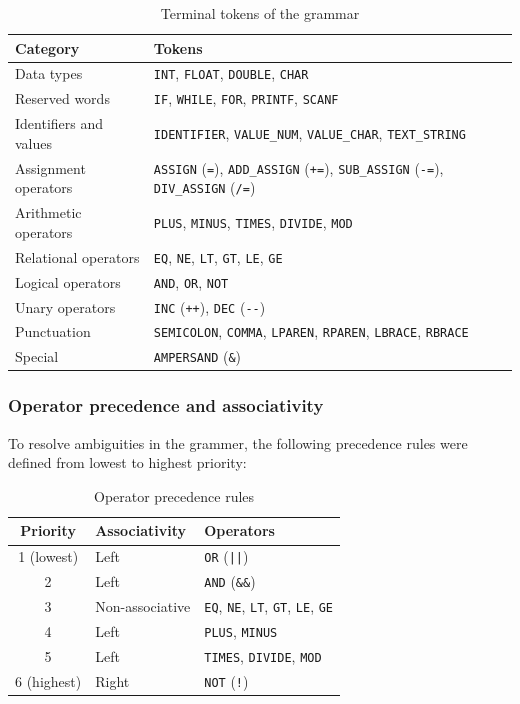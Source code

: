 \documentclass[letterpaper,12pt,oneside]{article}
\begin{document}
\begin{table}[H]
\centering
\caption{Terminal tokens of the grammar}
\begin{tabular}{|l|l|}
\hline
\rowcolor{gray!20}
\textbf{Category} & \textbf{Tokens} \\
\hline
Data types & \texttt{INT}, \texttt{FLOAT}, \texttt{DOUBLE}, \texttt{CHAR} \\
\hline
Reserved words & \texttt{IF}, \texttt{WHILE}, \texttt{FOR}, \texttt{PRINTF}, \texttt{SCANF} \\
\hline
Identifiers and values & \texttt{IDENTIFIER}, \texttt{VALUE\_NUM}, \texttt{VALUE\_CHAR}, \texttt{TEXT\_STRING} \\
\hline
Assignment operators & \texttt{ASSIGN} (\texttt{=}), \texttt{ADD\_ASSIGN} (\texttt{+=}), \texttt{SUB\_ASSIGN} (\texttt{-=}), \texttt{DIV\_ASSIGN} (\texttt{/=}) \\
\hline
Arithmetic operators & \texttt{PLUS}, \texttt{MINUS}, \texttt{TIMES}, \texttt{DIVIDE}, \texttt{MOD} \\
\hline
Relational operators & \texttt{EQ}, \texttt{NE}, \texttt{LT}, \texttt{GT}, \texttt{LE}, \texttt{GE} \\
\hline
Logical operators & \texttt{AND}, \texttt{OR}, \texttt{NOT} \\
\hline
Unary operators & \texttt{INC} (\texttt{++}), \texttt{DEC} (\texttt{-{}-}) \\
\hline
Punctuation & \texttt{SEMICOLON}, \texttt{COMMA}, \texttt{LPAREN}, \texttt{RPAREN}, \texttt{LBRACE}, \texttt{RBRACE} \\
\hline
Special & \texttt{AMPERSAND} (\texttt{\&}) \\
\hline
\end{tabular}
\end{table}

\subsubsection{Operator precedence and associativity}

To resolve ambiguities in the grammer, the following precedence rules were defined from lowest to highest priority:

\begin{table}[H]
\centering
\caption{Operator precedence rules}
\begin{tabular}{|c|l|l|}
\hline
\rowcolor{gray!20}
\textbf{Priority} & \textbf{Associativity} & \textbf{Operators} \\
\hline
1 (lowest) & Left & \texttt{OR} (\texttt{||}) \\
\hline
2 & Left & \texttt{AND} (\texttt{\&\&}) \\
\hline
3 & Non-associative & \texttt{EQ}, \texttt{NE}, \texttt{LT}, \texttt{GT}, \texttt{LE}, \texttt{GE} \\
\hline
4 & Left & \texttt{PLUS}, \texttt{MINUS} \\
\hline
5 & Left & \texttt{TIMES}, \texttt{DIVIDE}, \texttt{MOD} \\
\hline
6 (highest) & Right & \texttt{NOT} (\texttt{!}) \\
\hline
\end{tabular}
\end{table}
\end{document}
